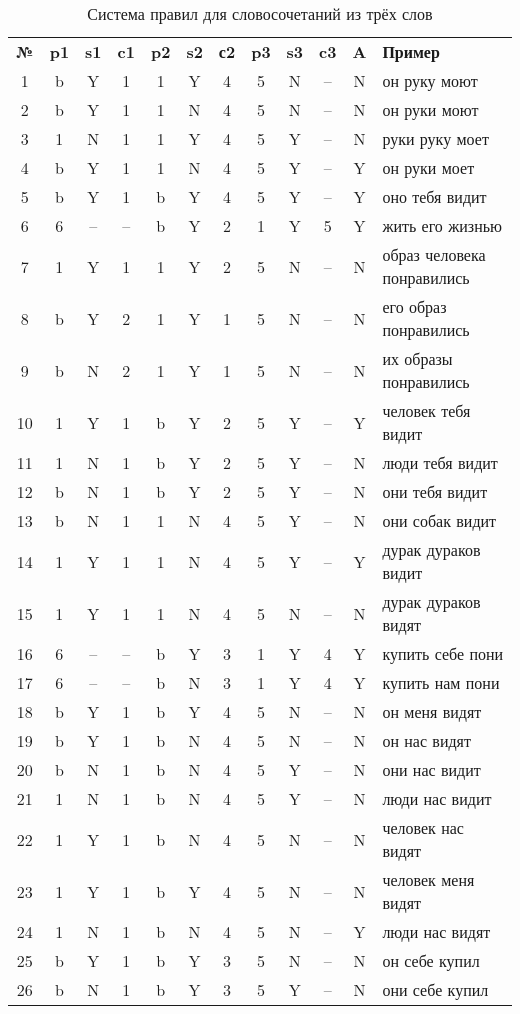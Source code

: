 \documentclass[main]{subfiles}
\begin{document}
\begin{longtable}[c]{|c|c|c|c|c|c|c|c|c|c|c|p{120px}|}
	\captionsetup{format=hang,labelsep = endash, singlelinecheck=false}
\caption{Система правил для словосочетаний из трёх слов}\label{tab2}\\
	\hline
	\textbf{№}&\textbf{p1} &\textbf{s1}&\textbf{c1}&\textbf{p2}&\textbf{s2}&\textbf{с2}&\textbf{p3}&\textbf{s3}&\textbf{c3}&\textbf{A}&\textbf{Пример} \\ \hline
	1 &b  &Y  &1  &1  &Y  &4  &5  &N &--&N&он руку моют \\ \hline
	2&b&Y&1&1&N&4&5&N&--&N&он руки моют\\ \hline
	3&1&N&1&1&Y&4&5&Y&--&N&руки руку моет\\ \hline
	4&b&Y&1&1&N&4&5&Y&--&Y&он руки моет\\ \hline
	5&b&Y&1&b&Y&4&5&Y&--&Y& оно тебя видит\\ \hline
	6&6&--&--&b&Y&2&1&Y&5&Y&жить его жизнью \\ \hline
	7&1&Y&1&1&Y&2&5&N&--&N&образ человека понравились\\ \hline
	8&b&Y&2&1&Y&1&5&N&--&N&его образ понравились\\ \hline
	9&b&N&2&1&Y&1&5&N&--&N&их образы понравились\\ \hline
	10&1&Y&1&b&Y&2&5&Y&--&Y&человек тебя видит \\ \hline
	11&1&N&1&b&Y&2&5&Y&--&N&люди тебя видит\\ \hline
	12&b&N&1&b&Y&2&5&Y&--&N&они тебя видит\\ \hline
	13&b&N&1&1&N&4&5&Y&--&N&они собак видит\\ \hline
	14&1&Y&1&1&N&4&5&Y&--&Y&дурак дураков видит\\ \hline
	15&1&Y&1&1&N&4&5&N&--&N&дурак дураков видят\\ \hline
	16&6&--&--&b&Y&3&1&Y&4&Y&купить себе пони\\ \hline
	17&6&--&--&b&N&3&1&Y&4&Y&купить нам пони\\ \hline
	18&b&Y&1&b&Y&4&5&N&--&N&он меня видят\\ \hline
	19&b&Y&1&b&N&4&5&N&--&N&он нас видят\\ \hline
	20&b&N&1&b&N&4&5&Y&--&N&они нас видит\\ \hline
	21&1&N&1&b&N&4&5&Y&--&N&люди нас видит\\ \hline
	22&1&Y&1&b&N&4&5&N&--&N&человек нас видят\\ \hline
	23&1&Y&1&b&Y&4&5&N&--&N&человек меня видят\\ \hline
	24&1&N&1&b&N&4&5&N&--&Y&люди нас видят\\ \hline
	25&b&Y&1&b&Y&3&5&N&--&N&он себе купил\\ \hline
	26&b&N&1&b&Y&3&5&Y&--&N&они себе купил \\ \hline
\end{longtable}
\end{document}

